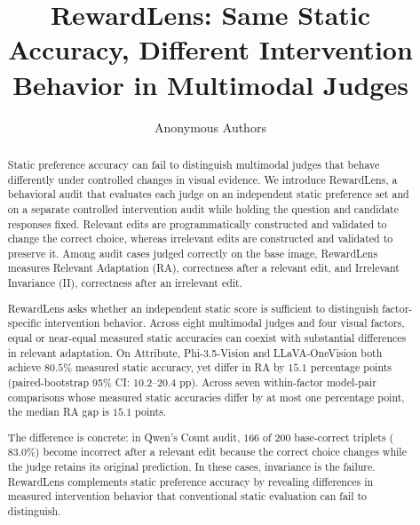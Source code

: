 \documentclass{article}
\title{RewardLens: Same Static Accuracy, Different Intervention Behavior in Multimodal Judges}
\author{Anonymous Authors}
\providecommand{\RelatedWorkSection}{sections/02_related_work}
\begin{document}
\raggedbottom

\maketitle

\begin{abstract}
Static preference accuracy can fail to distinguish multimodal judges that
behave differently under controlled changes in visual evidence.
We introduce RewardLens, a behavioral audit that evaluates each judge on an
independent static preference set and on a separate controlled intervention
audit while holding the question and candidate responses fixed. Relevant edits
are programmatically constructed and validated to change the correct choice,
whereas irrelevant edits are constructed and validated to preserve it. Among
audit cases judged correctly on the base
image, RewardLens measures Relevant Adaptation (RA), correctness after a
relevant edit, and Irrelevant Invariance (II), correctness after an irrelevant
edit.

RewardLens asks whether an independent static score is sufficient to distinguish
factor-specific intervention behavior. Across eight multimodal judges and four
visual factors, equal or near-equal measured static accuracies can coexist with
substantial differences in relevant adaptation. On Attribute, Phi-3.5-Vision
and LLaVA-OneVision both achieve $80.5\%$ measured static accuracy, yet differ
in RA by $15.1$ percentage points (paired-bootstrap 95\% CI: $10.2$--$20.4$
pp). Across seven within-factor model-pair comparisons whose measured static
accuracies differ by at most one percentage point, the median RA gap is
$15.1$ points.

The difference is concrete: in Qwen's Count audit, $166$ of $200$ base-correct
triplets ($83.0\%$) become incorrect after a relevant edit because the correct
choice changes while the judge retains its original prediction. In these cases,
invariance is the failure. RewardLens complements static preference accuracy by
revealing differences in measured intervention behavior that conventional
static evaluation can fail to distinguish.
\end{abstract}










\end{document}
